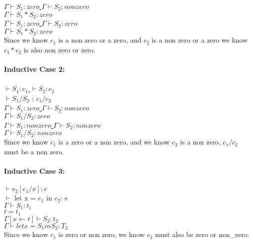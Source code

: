 \documentclass[11pt]{article}
\begin{document}
\begin{enumerate}
\begin{enumerate}
			\underline{$\Gamma\vdash S_1:zero$ \hspace{12} $\Gamma\vdash S_2:non zero$}\\
			$\Gamma\vdash S_1*S_2:zero$\\
		
			\underline{$\Gamma\vdash S_1:zero$ \hspace{12} $\Gamma\vdash S_2:zero$}\\
			$\Gamma\vdash S_1*S_2:zero$\\
			
			Since we know $c_1$ is a non zero or a zero, and $c_2$ is a non zero or a zero we know $c_1*c_2$ is also non zero or zero.\\
			\\
			\textbf{Inductive Case 2:}\\
			\\
			\underline{$\vdash S_1:c_1$ \hspace{12} $\vdash S_2:c_2$}\\
			$\vdash S_1/S_2$ : $c_1/c_2$\\
			
			\underline{$\Gamma\vdash S_1:zero$ \hspace{12} $\Gamma\vdash S_2:non zero$}\\
		$\Gamma\vdash S_1/S_2:zero$\\
		
		\underline{$\Gamma\vdash S_1:non zero$ \hspace{12} $\Gamma\vdash S_2:non zero$}\\
		$\Gamma\vdash S_1/S_2:non zero$\\
		
		Since we know $c_1$ is a zero or a non zero, and we know $c_2$ is a non zero, $c_1/c_2$ must be a non zero.\\
		\\
		\textbf{Inductive Case 3:}\\
		\\
		\underline{$\vdash e_2[e_1/x]:e$}\\
		$\vdash$ let x = $e_1$ in $e_2$: e\\
		
		$\Gamma\vdash S_1: t_1$\\
		$t = t_1$\\
		\underline{$\Gamma[x \leftarrow t]\vdash S_2:t_2$ }\\
		$\Gamma\vdash let x=S_1 in S_2:T_2$\\
		
		Since we know $c_1$ is zero or non zero, we know $c_2$ must also be zero or non_zero.\\
	

\end{enumerate}
\end{enumerate}
\end{document}
